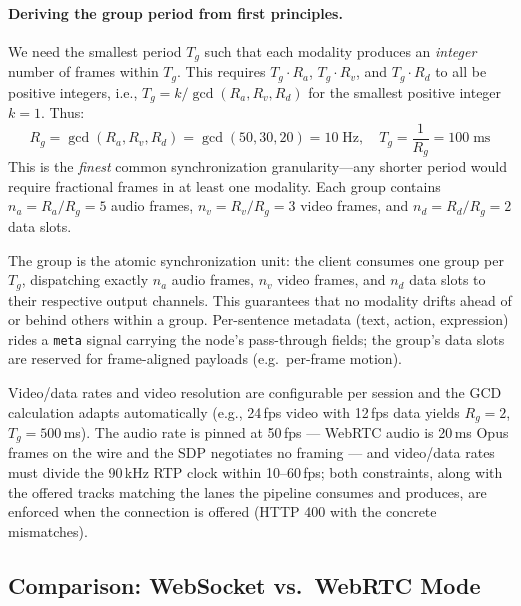 \documentclass[11pt,a4paper]{article}
\begin{document}
\paragraph{Deriving the group period from first principles.}
We need the smallest period $T_g$ such that each modality produces an \emph{integer} number of frames within $T_g$. This requires $T_g \cdot R_a$, $T_g \cdot R_v$, and $T_g \cdot R_d$ to all be positive integers, i.e., $T_g = k / \gcd(R_a, R_v, R_d)$ for the smallest positive integer $k=1$. Thus:
\begin{equation}
\label{eq:gcd}
R_g = \gcd(R_a, R_v, R_d) = \gcd(50, 30, 20) = 10 \;\text{Hz}, \quad T_g = \frac{1}{R_g} = 100\;\text{ms}
\end{equation}
This is the \emph{finest} common synchronization granularity---any shorter period would require fractional frames in at least one modality. Each group contains $n_a = R_a/R_g = 5$ audio frames, $n_v = R_v/R_g = 3$ video frames, and $n_d = R_d/R_g = 2$ data slots.

The group is the atomic synchronization unit: the client consumes one group per $T_g$, dispatching exactly $n_a$ audio frames, $n_v$ video frames, and $n_d$ data slots to their respective output channels. This guarantees that no modality drifts ahead of or behind others within a group. Per-sentence metadata (text, action, expression) rides a \texttt{meta} signal carrying the node's pass-through fields; the group's data slots are reserved for frame-aligned payloads (e.g.\ per-frame motion).

Video/data rates and video resolution are configurable per session and the GCD calculation adapts automatically (e.g., 24\,fps video with 12\,fps data yields $R_g = 2$, $T_g = 500$\,ms). The audio rate is pinned at 50\,fps --- WebRTC audio is 20\,ms Opus frames on the wire and the SDP negotiates no framing --- and video/data rates must divide the 90\,kHz RTP clock within 10--60\,fps; both constraints, along with the offered tracks matching the lanes the pipeline consumes and produces, are enforced when the connection is offered (HTTP 400 with the concrete mismatches).

\subsection{Comparison: WebSocket vs.\ WebRTC Mode}
\end{document}
